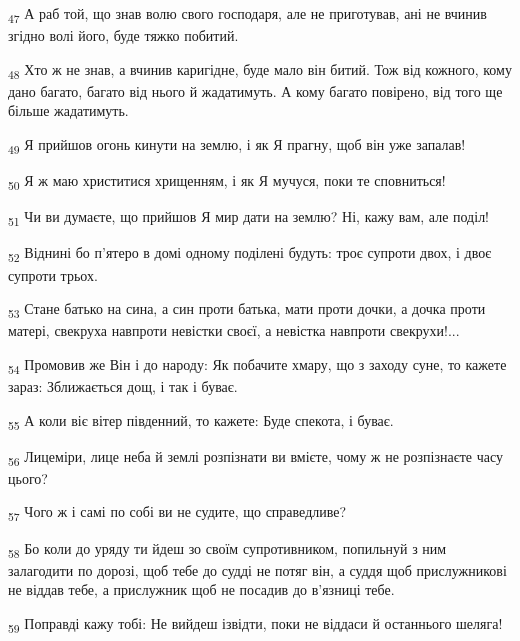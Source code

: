 \begin{tcolorbox}
\textsubscript{47} А раб той, що знав волю свого господаря, але не приготував, ані не вчинив згідно волі його, буде тяжко побитий.
\end{tcolorbox}
\begin{tcolorbox}
\textsubscript{48} Хто ж не знав, а вчинив каригідне, буде мало він битий. Тож від кожного, кому дано багато, багато від нього й жадатимуть. А кому багато повірено, від того ще більше жадатимуть.
\end{tcolorbox}
\begin{tcolorbox}
\textsubscript{49} Я прийшов огонь кинути на землю, і як Я прагну, щоб він уже запалав!
\end{tcolorbox}
\begin{tcolorbox}
\textsubscript{50} Я ж маю христитися хрищенням, і як Я мучуся, поки те сповниться!
\end{tcolorbox}
\begin{tcolorbox}
\textsubscript{51} Чи ви думаєте, що прийшов Я мир дати на землю? Ні, кажу вам, але поділ!
\end{tcolorbox}
\begin{tcolorbox}
\textsubscript{52} Віднині бо п'ятеро в домі одному поділені будуть: троє супроти двох, і двоє супроти трьох.
\end{tcolorbox}
\begin{tcolorbox}
\textsubscript{53} Стане батько на сина, а син проти батька, мати проти дочки, а дочка проти матері, свекруха навпроти невістки своєї, а невістка навпроти свекрухи!...
\end{tcolorbox}
\begin{tcolorbox}
\textsubscript{54} Промовив же Він і до народу: Як побачите хмару, що з заходу суне, то кажете зараз: Зближається дощ, і так і буває.
\end{tcolorbox}
\begin{tcolorbox}
\textsubscript{55} А коли віє вітер південний, то кажете: Буде спекота, і буває.
\end{tcolorbox}
\begin{tcolorbox}
\textsubscript{56} Лицеміри, лице неба й землі розпізнати ви вмієте, чому ж не розпізнаєте часу цього?
\end{tcolorbox}
\begin{tcolorbox}
\textsubscript{57} Чого ж і самі по собі ви не судите, що справедливе?
\end{tcolorbox}
\begin{tcolorbox}
\textsubscript{58} Бо коли до уряду ти йдеш зо своїм супротивником, попильнуй з ним залагодити по дорозі, щоб тебе до судді не потяг він, а суддя щоб прислужникові не віддав тебе, а прислужник щоб не посадив до в'язниці тебе.
\end{tcolorbox}
\begin{tcolorbox}
\textsubscript{59} Поправді кажу тобі: Не вийдеш ізвідти, поки не віддаси й останнього шеляга!
\end{tcolorbox}
